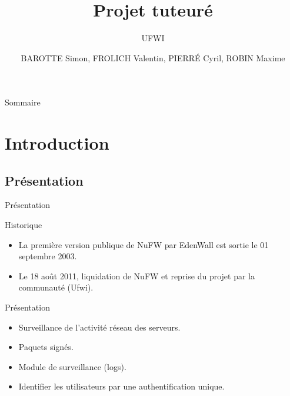 \documentclass[t,12pt]{beamer}
\title{Projet tuteuré}
\subtitle{\tiny{UFWI}}
\author{BAROTTE Simon, FROLICH Valentin, PIERRÉ Cyril, ROBIN Maxime}
\begin{document}
\frame{\titlepage}


\begin{frame}{Sommaire}
	\tableofcontents[]       %
\end{frame} 

\section{Introduction}  
  \subsection{Présentation}                                            
    \begin{frame}{Présentation}                                              
	    \begin{block}{Historique}
        \begin{itemize}  
	        \item La première version publique de NuFW par EdenWall est sortie le 01 septembre 2003.
	        \item Le 18 août 2011, liquidation de NuFW et reprise du projet par la communauté (Ufwi).
        \end{itemize} 
      \end{block}
      \pause
      \begin{block}{Présentation}
        \begin{itemize}  
	        \item Surveillance de l'activité réseau des serveurs.
	        \item Paquets signés.
	        \item Module de surveillance (logs).
          \item Identifier les utilisateurs par une authentification unique.
        \end{itemize} 
      \end{block}
    \end{frame} 
\end{document}
